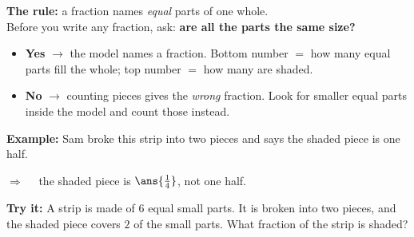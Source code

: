 \documentclass[12pt]{article}
\begin{document}


\begin{formulabox}
\textbf{The rule:} a fraction names \emph{equal} parts of one whole.\\[3pt]
Before you write any fraction, ask: \textbf{are all the parts the same size?}
\begin{itemize}[leftmargin=0.7cm, itemsep=1pt, topsep=2pt]
  \item \textbf{Yes} $\rightarrow$ the model names a fraction. Bottom number
        $=$ how many equal parts fill the whole; top number $=$ how many are
        shaded.
  \item \textbf{No} $\rightarrow$ counting pieces gives the \emph{wrong}
        fraction. Look for smaller equal parts inside the model and count
        those instead.
\end{itemize}
\end{formulabox}

\begin{examplebox}
\textbf{Example:} Sam broke this strip into two pieces and says the shaded
piece is one half.
\begin{center}
\end{center}
$\Rightarrow\quad$ the shaded piece is $\ans{\tfrac{1}{4}}$, not one half.
\end{examplebox}

\begin{tryitbox}
\textbf{Try it:} A strip is made of $6$ equal small parts. It is broken into
two pieces, and the shaded piece covers $2$ of the small parts. What fraction
of the strip is shaded?\\[2pt]
\end{tryitbox}

\end{document}
